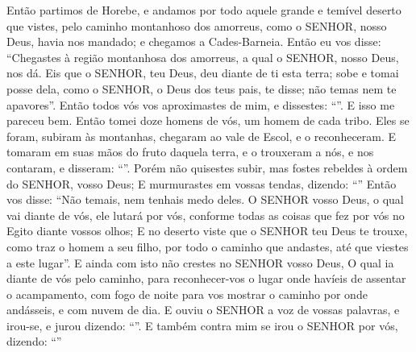 {{  Então partimos de Horebe, e andamos por todo aquele grande e temível deserto que vistes, pelo caminho montanhoso dos amorreus, como o SENHOR, nosso Deus, havia nos mandado; e chegamos a Cades-Barneia.
  Então eu vos disse: \enquote{Chegastes à região montanhosa dos amorreus, a qual o SENHOR, nosso Deus, nos dá.
  Eis que o SENHOR, teu Deus, deu diante de ti esta terra; sobe e tomai posse dela, como o SENHOR, o Deus dos teus pais, te disse; não temas nem te apavores}.
  Então todos vós vos aproximastes de mim, e dissestes: \enquote{}.
  E isso me pareceu bem. Então tomei doze homens de vós, um homem de cada tribo.
  Eles se foram, subiram às montanhas, chegaram ao vale de Escol, e o reconheceram.
  E tomaram em suas mãos do fruto daquela terra, e o trouxeram a nós, e nos contaram, e disseram: \enquote{}.
  Porém não quisestes subir, mas fostes rebeldes à ordem do SENHOR, vosso Deus;
  E murmurastes em vossas tendas, dizendo: \enquote{}
  Então vos disse: \enquote{Não temais, nem tenhais medo deles.
  O SENHOR vosso Deus, o qual vai diante de vós, ele lutará por vós, conforme todas as coisas que fez por vós no Egito diante vossos olhos;
  E no deserto viste que o SENHOR teu Deus te trouxe, como traz o homem a seu filho, por todo o caminho que andastes, até que viestes a este lugar}.
  E ainda com isto não crestes no SENHOR vosso Deus,
  O qual ia diante de vós pelo caminho, para reconhecer-vos o lugar onde havíeis de assentar o acampamento, com fogo de noite para vos mostrar o caminho por onde andásseis, e com nuvem de dia.
  E ouviu o SENHOR a voz de vossas palavras, e irou-se, e jurou dizendo:
  \enquote{}.
  E também contra mim se irou o SENHOR por vós, dizendo: \enquote{}}}
